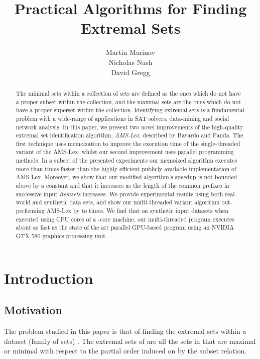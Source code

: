 \documentclass[13pt,a4paper]{article}
\begin{document}
\title{Practical Algorithms for Finding Extremal Sets}
\author{Martin Marinov\\ Nicholas Nash\\ David Gregg}
\maketitle


\begin{abstract}
The minimal sets within a collection of sets are defined as the ones which do not have a proper subset within the collection, and the maximal sets are the ones which do not have a proper superset within the collection. Identifying extremal sets is a fundamental problem with a wide-range of applications in SAT solvers, data-mining and social network analysis. In this paper, we present two novel improvements of the high-quality extremal set identification algorithm, \textit{AMS-Lex}, described by Bayardo and Panda. The first technique uses memoization to improve the execution time of the single-threaded variant of the AMS-Lex, whilst our second improvement uses parallel programming methods. In a subset of the presented experiments our memoized algorithm executes more than  times faster than the highly efficient publicly available implementation of AMS-Lex. Moreover, we show that our modified algorithm's speedup is not bounded above by a constant and that it increases as the length of the common prefixes in successive input \textit{itemsets} increases. We provide experimental results using both real-world and synthetic data sets, and show our multi-threaded variant algorithm out-performing AMS-Lex by  to  times. We find that on synthetic input datasets when executed using  CPU cores of a -core machine, our multi-threaded program executes about as fast as the state of the art parallel GPU-based program using an NVIDIA GTX 580 graphics processing unit.
\end{abstract}


\section{Introduction}
\label{sec:intro}
\subsection{Motivation}
\label{sec:intro:back+motiv}
\noindent

The problem studied in this paper is that of finding the extremal sets within a dataset (family of sets) . The extremal sets of  are all the sets in  that are maximal or minimal with respect to the partial order induced on  by the subset relation.
\end{document}
